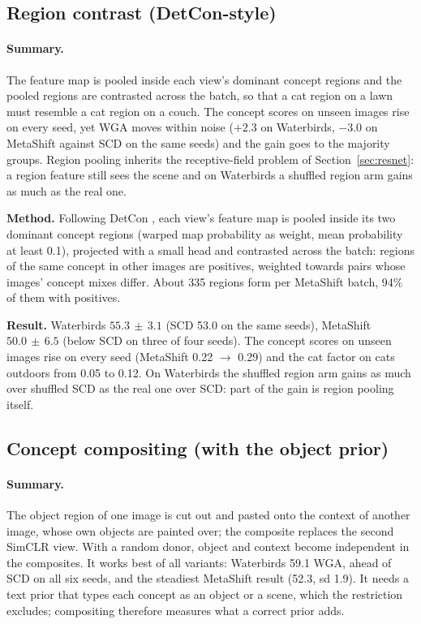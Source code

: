 \documentclass[11pt]{article}
\newcommand{\pmsd}[2]{$#1{\scriptstyle\,\pm\,#2}$}
\newcommand{\summary}{\paragraph{Summary.}}
\begin{document}
\subsection{Region contrast (DetCon-style)}
\summary The feature map is pooled inside each view's dominant concept regions and the pooled regions are contrasted
across the batch, so that a cat region on a lawn must resemble a cat region on a couch. The concept scores on unseen
images rise on every seed, yet WGA moves within noise ($+2.3$ on Waterbirds, $-3.0$ on MetaShift against SCD on the
same seeds) and the gain goes to the majority groups. Region pooling inherits the receptive-field problem of
Section~\ref{sec:resnet}: a region feature still sees the scene and on Waterbirds a shuffled region arm gains as much
as the real one.

\textbf{Method.} Following DetCon \citep{henaff2021detcon}, each view's feature map is pooled inside its two dominant
concept regions (warped map probability as weight, mean probability at least 0.1), projected with a small head and
contrasted across the batch: regions of the same concept in other images are positives, weighted towards pairs whose
images' concept mixes differ. About 335 regions form per MetaShift batch, 94\% of them with positives.

\textbf{Result.} Waterbirds \pmsd{55.3}{3.1} (SCD 53.0 on the same seeds), MetaShift \pmsd{50.0}{6.5} (below SCD on three
of four seeds). The concept scores on unseen images rise on every seed (MetaShift 0.22 $\to$ 0.29) and the cat factor
on cats outdoors from 0.05 to 0.12. On Waterbirds the shuffled region arm gains as much over shuffled SCD as the real
one over SCD: part of the gain is region pooling itself.

\subsection{Concept compositing (with the object prior)}
\summary The object region of one image is cut out and pasted onto the context of another image, whose own objects are
painted over; the composite replaces the second SimCLR view. With a random donor, object and context become
independent in the composites. It works best of all variants: Waterbirds 59.1 WGA, ahead of SCD on all six seeds, and
the steadiest MetaShift result (52.3, sd 1.9). It needs a text prior that types each concept as an object or a scene,
which the restriction excludes; compositing therefore measures what a correct prior adds.
\end{document}
